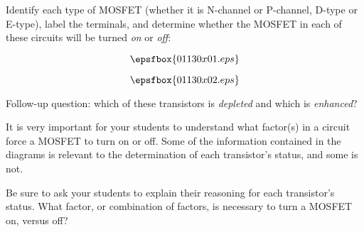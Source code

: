 

Identify each type of MOSFET (whether it is N-channel or P-channel, D-type or E-type), label the terminals, and determine whether the MOSFET in each of these circuits will be turned {\it on} or {\it off}:

$$\epsfbox{01130x01.eps}$$







$$\epsfbox{01130x02.eps}$$

\vskip 10pt

Follow-up question: which of these transistors is {\it depleted} and which is {\it enhanced}?







It is very important for your students to understand what factor(s) in a circuit force a MOSFET to turn on or off.  Some of the information contained in the diagrams is relevant to the determination of each transistor's status, and some is not.

Be sure to ask your students to explain their reasoning for each transistor's status.  What factor, or combination of factors, is necessary to turn a MOSFET on, versus off?




